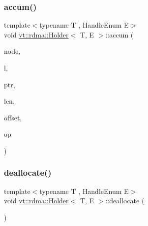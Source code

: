 \mbox{\label{structvt_1_1rdma_1_1_holder_affd535937b2b5e3bd243e4cae43d779e}} 
\subsubsection{\texorpdfstring{accum()}{accum()}}
{\footnotesize\ttfamily template$<$typename T , Handle\+Enum E$>$ \\
void \hyperlink{structvt_1_1rdma_1_1_holder}{vt\+::rdma\+::\+Holder}$<$ T, E $>$\+::accum (\begin{DoxyParamCaption}\item[{\hyperlink{namespacevt_a866da9d0efc19c0a1ce79e9e492f47e2}{vt\+::\+Node\+Type}}]{node,  }\item[{\hyperlink{namespacevt_1_1rdma_ac5c20b41a653e520b6305d4d454ecb70}{Lock}}]{l,  }\item[{T $\ast$}]{ptr,  }\item[{std\+::size\+\_\+t}]{len,  }\item[{int}]{offset,  }\item[{M\+P\+I\+\_\+\+Op}]{op }\end{DoxyParamCaption})}

\mbox{\label{structvt_1_1rdma_1_1_holder_afe6dd03862a68f941a44258aac9ef03d}} 
\subsubsection{\texorpdfstring{deallocate()}{deallocate()}}
{\footnotesize\ttfamily template$<$typename T , Handle\+Enum E$>$ \\
void \hyperlink{structvt_1_1rdma_1_1_holder}{vt\+::rdma\+::\+Holder}$<$ T, E $>$\+::deallocate (\begin{DoxyParamCaption}{ }\end{DoxyParamCaption})}

\mbox{\label{structvt_1_1rdma_1_1_holder_ae0131450f2f087c80faa444810aa25ed}} 

